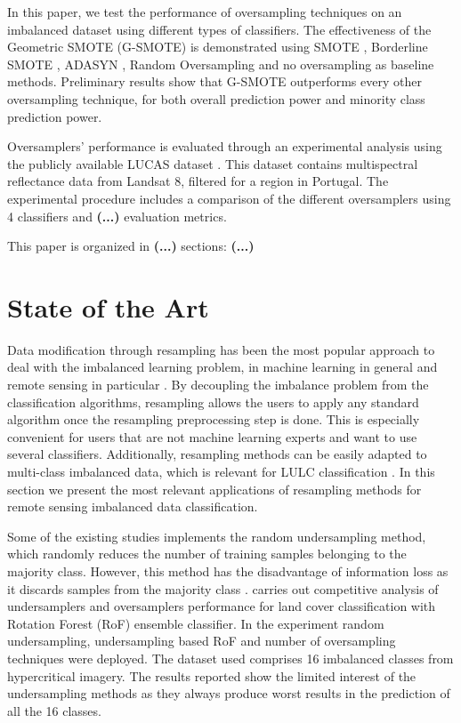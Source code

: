 \documentclass[parskip=full]{scrartcl}
\begin{document}
In this paper, we test the performance of oversampling techniques on an
imbalanced dataset using different types of classifiers. The effectiveness of
the Geometric SMOTE (G-SMOTE) \cite{Douzas2019} is demonstrated using SMOTE
\cite{Chawla2002}, Borderline SMOTE \cite{Han2005}, ADASYN \cite{HaiboHe2008},
Random Oversampling and no oversampling as baseline methods. Preliminary results
show that G-SMOTE outperforms every other oversampling technique, for both
overall prediction power and minority class prediction power.

Oversamplers' performance is evaluated through an experimental analysis using
the publicly available LUCAS dataset \cite{LUCAS2015}. This dataset contains
multispectral reflectance data from Landsat 8, filtered for a region in
Portugal. The experimental procedure includes a comparison of the different
oversamplers using 4 classifiers and \textbf{(...)} evaluation metrics.

This paper is organized in \textbf{(...)} sections: \textbf{(...)}

\section{State of the Art}

Data modification through resampling has been the most popular approach to deal 
with the imbalanced learning problem, in machine learning in general 
\cite{Douzas2019} and remote sensing in particular \cite{Feng2019}. By 
decoupling the imbalance problem from the classification algorithms, resampling 
allows the users to apply any standard algorithm once the resampling 
preprocessing step is done. This is especially convenient for users that are 
not machine learning experts and want to use several classifiers. Additionally, 
resampling methods can be easily adapted to multi-class imbalanced data, which 
is relevant for LULC classification \cite{Feng2019}. In this section we present 
the most relevant applications of resampling methods for remote sensing 
imbalanced data classification. 

Some of the existing studies implements the random undersampling method,
which randomly reduces the number of training samples  belonging to the
majority class. However, this method has the disadvantage of information loss
as it discards samples from the majority class  \cite{Feng2019}.
\cite{Feng2018} carries out competitive analysis of  undersamplers and
oversamplers performance for land cover classification with  Rotation Forest
(RoF) ensemble classifier. In the experiment random  undersampling,
undersampling based RoF and number of oversampling techniques  were deployed.
The dataset used comprises 16 imbalanced classes from  hypercritical imagery.
The results reported show the limited interest of the  undersampling methods as 
they always produce worst results in the prediction of all the 16 classes.
\end{document}
